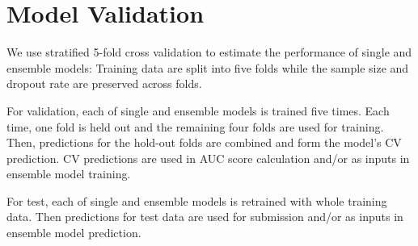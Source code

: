 \section{Model Validation}
We use stratified 5-fold cross validation to estimate the performance of single and ensemble models:
Training data are split into five folds while the sample size and dropout rate are preserved across folds.

For validation, each of single and ensemble models is trained five times. Each time, one fold is held out and the remaining four folds are used for training. Then, predictions for the hold-out folds are combined and form the model's CV prediction. CV predictions are used in AUC score calculation and/or as inputs in ensemble model training.

For test, each of single and ensemble models is retrained with whole training data. Then predictions for test data are used for submission and/or as inputs in ensemble model prediction.

